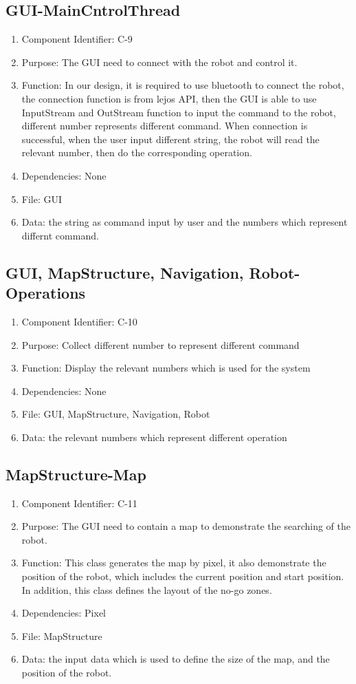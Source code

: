 \documentclass[11pt, a4paper]{report}
\begin{document}
\subsection{GUI-MainCntrolThread}
\begin{enumerate}
\item Component Identifier: C-9
\item Purpose: The GUI need to connect with the robot and control it.
\item Function: In our design, it is required to use bluetooth to connect the robot, the connection function is from lejos API, then the GUI is able to use InputStream and OutStream function to input the command to the robot, different number represents different command. When connection is successful, when the user input different string, the robot will read the relevant number, then do the corresponding operation.   
\item Dependencies: None
\item File: GUI
\item Data: the string as command input by user and the numbers which represent differnt command. 
\end{enumerate}

\subsection{GUI, MapStructure, Navigation, Robot-Operations}
\begin{enumerate}
\item Component Identifier: C-10
\item Purpose: Collect different number to represent different command
\item Function: Display the relevant numbers which is used for the system
\item Dependencies: None
\item File: GUI, MapStructure, Navigation, Robot
\item Data: the relevant numbers which represent different operation
\end{enumerate}

\subsection{MapStructure-Map}
\begin{enumerate}
\item Component Identifier: C-11
\item Purpose: The GUI need to contain a map to demonstrate the searching of the robot. 
\item Function: This class generates the map by pixel, it also demonstrate the position of the robot, which includes the current position and start position. In addition, this class defines the layout of the no-go zones.
\item Dependencies: Pixel
\item File: MapStructure
\item Data: the input data which is used to define the size of the map, and the position of the robot.
\end{enumerate}
\end{document}
